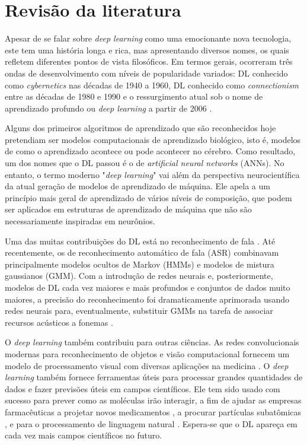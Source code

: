 \section{Revisão da literatura}

Apesar de se falar sobre \textit{deep learning} como uma emocionante nova tecnologia, este tem uma história longa e rica, mas apresentando diversos nomes, os quais refletem diferentes pontos de vista filosóficos. Em termos gerais, ocorreram três ondas de desenvolvimento com níveis de popularidade variados: DL conhecido como \textit{cybernetics} nas décadas de 1940 a 1960, DL conhecido como \textit{connectionism} entre as décadas de 1980 e 1990 e o ressurgimento atual sob o nome de aprendizado profundo ou \textit{deep learning} a partir de 2006 \cite{Goodfellow-et-al-2016}.

Alguns dos primeiros algoritmos de aprendizado que são reconhecidos hoje pretendiam ser modelos computacionais de aprendizado biológico, isto é, modelos de como o aprendizado acontece ou pode acontecer no cérebro. Como resultado, um dos nomes que o DL passou é o de \textit{artificial neural networks} (ANNs). No entanto, o termo moderno "\textit{deep learning}" vai além da perspectiva neurocientífica da atual geração de modelos de aprendizado de máquina. Ele apela a um princípio mais geral de aprendizado de vários níveis de composição, que podem ser aplicados em estruturas de aprendizado de máquina que não são necessariamente inspiradas em neurônios.


Uma das muitas contribuições do DL está no reconhecimento de fala \cite{nassif:speech-rec:2019}. Até recentemente, os de reconhecimento automático de fala (ASR) combinavam principalmente modelos ocultos de Markov (HMMs) e modelos de mistura gaussianos (GMM). Com a introdução de redes neurais e, posteriormente, modelos de DL cada vez maiores e mais profundos e conjuntos de dados muito maiores, a precisão do reconhecimento foi dramaticamente aprimorada usando redes neurais para, eventualmente, substituir GMMs na tarefa de associar recursos acústicos a fonemas \cite{Goodfellow-et-al-2016}.


O \textit{deep learning} também contribuiu para outras ciências. As redes convolucionais modernas para reconhecimento de objetos e visão computacional fornecem um modelo de processamento visual com diversas aplicações na medicina \cite{Yeung:comp-vis:2019,dicarlo-afrax-yamins:2014}. O \textit{deep learning} também fornece ferramentas úteis para processar grandes quantidades de dados e fazer previsões úteis em campos científicos. Ele tem sido usado com sucesso para prever como as moléculas irão interagir, a fim de ajudar as empresas farmacêuticas a projetar novos medicamentos \cite{dahl2014multitask}, a procurar partículas subatômicas \cite{baldi:s:w:2015}, e para o processamento de linguagem natural \cite{Young_2018}. Espera-se que o DL apareça em cada vez mais campos científicos no futuro.

